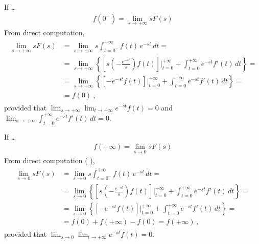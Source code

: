 \documentclass[letterpaper,10pt,english]{jupyterBook}
\begin{document}
\sphinxAtStartPar
{} If …
\begin{equation*}
\begin{split}f(0^+) = \lim_{s \rightarrow + \infty} s F(s)\end{split}
\end{equation*}
\sphinxAtStartPar
From direct computation,
\begin{equation*}
\begin{split}\begin{aligned}
 \lim_{s \rightarrow +\infty} s F(s)
 & = \lim_{s \rightarrow +\infty} s \int_{t = 0^-}^{+\infty} f(t) \, e^{-st} \, dt = \\
 & = \lim_{s\rightarrow + \infty} \left\{ \left[s \left(-\frac{e^{-st}}{s}\right)f(t) \right]\bigg|_{t=0}^{+\infty} + \int_{t=0}^{+\infty} e^{-st} f'(t) \, dt \right\} = \\
 & = \lim_{s \rightarrow +\infty} \left\{ \left[-e^{-st} f(t) \right]\bigg|_{t=0}^{+\infty} + \int_{t=0}^{+\infty} e^{-st} f'(t) \, dt \right\} = \\
 & = f(0) \ ,
\end{aligned}\end{split}
\end{equation*}
\sphinxAtStartPar
provided that \(\lim_{s \rightarrow +\infty} \lim_{t \rightarrow +\infty} e^{-s t} f(t) = 0\) and \(\lim_{s \rightarrow + \infty} \int_{t=0}^{+\infty} e^{-st} f'(t) \, dt = 0\).

\sphinxAtStartPar
{} If …
\begin{equation*}
\begin{split}f(+\infty) = \lim_{s \rightarrow 0} s F(s)\end{split}
\end{equation*}
\sphinxAtStartPar
From direct computation ( ),
\begin{equation*}
\begin{split}\begin{aligned}
 \lim_{s \rightarrow 0} s F(s)
 & = \lim_{s \rightarrow 0} s \int_{t = 0^-}^{+\infty} f(t) \, e^{-st} \, dt = \\
 & = \lim_{s \rightarrow 0} \left\{ \left[s \left(-\frac{e^{-st}}{s}\right)f(t) \right]\bigg|_{t=0}^{+\infty} + \int_{t=0}^{+\infty} e^{-st} f'(t) \, dt \right\} = \\
 & = \lim_{s \rightarrow 0} \left\{ \left[-e^{-st} f(t) \right]\bigg|_{t=0}^{+\infty} + \int_{t=0}^{+\infty} e^{-st} f'(t) \, dt \right\} = \\
 & = f(0) + f(+\infty) - f(0) = f(+\infty) \ ,
\end{aligned}\end{split}
\end{equation*}
\sphinxAtStartPar
provided that \(\lim_{s \rightarrow 0} \lim_{t \rightarrow +\infty} e^{-s t} f(t) = 0\).
\end{document}
